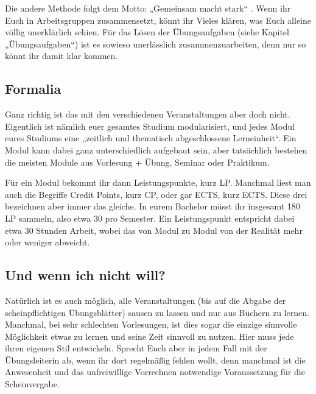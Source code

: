 Die andere Methode folgt dem Motto: „Gemeinsam macht stark“ . Wenn ihr Euch in Arbeitsgruppen zusammensetzt, könnt ihr Vieles klären, was Euch alleine völlig unerklärlich schien. Für das Lösen der Übungsaufgaben (siehe Kapitel „Übungsaufgaben“) ist es sowieso unerlässlich zusammenzuarbeiten, denn nur so könnt ihr damit klar kommen.

\subsection{Formalia}

Ganz richtig ist das mit den verschiedenen Veranstaltungen aber doch nicht. Eigentlich ist nämlich euer gesamtes Studium modularisiert, und jedes Modul eures Studiums eine „zeitlich und thematisch abgeschlossene Lerneinheit“. Ein Modul kann dabei ganz unterschiedlich aufgebaut sein, aber tatsächlich bestehen die meisten Module aus Vorlesung + Übung, Seminar oder Praktikum.

Für ein Modul bekommt ihr dann Leistungspunkte, kurz \gls{LP}. Manchmal liest man auch die Begriffe Credit Points, kurz \gls{CP}, oder gar \gls{ECTS}, kurz ECTS. Diese drei bezeichnen aber immer das gleiche. In eurem Bachelor müsst ihr insgesamt 180 \gls{LP} sammeln, also etwa 30 pro Semester. Ein Leistungspunkt entspricht dabei etwa 30 Stunden Arbeit, wobei das von Modul zu Modul von der Realität mehr oder weniger abweicht.

\subsection{Und wenn ich nicht will?}

Natürlich ist es auch möglich, alle Veranstaltungen (bis auf die Abgabe der scheinpflichtigen Übungsblätter) sausen zu lassen und nur aus Büchern zu lernen. Manchmal, bei sehr schlechten Vorlesungen, ist dies sogar die einzige sinnvolle Möglichkeit etwas zu lernen und seine Zeit sinnvoll zu nutzen. Hier muss jede ihren eigenen Stil entwickeln. Sprecht Euch aber in jedem Fall mit der Übungsleiterin ab, wenn ihr dort regelmäßig fehlen wollt, denn manchmal ist die Anwesenheit und das unfreiwillige Vorrechnen notwendige Voraussetzung für die Scheinvergabe.
